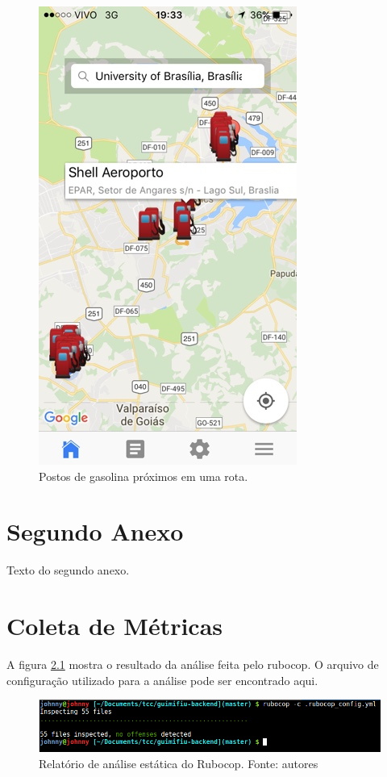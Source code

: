 \begin{anexosenv}
\begin{figure}[H]
    \centering
    \includegraphics[scale=0.5]{figuras/app_5.jpg}
    \caption[Postos de gasolina próximos em uma rota]{Postos de gasolina próximos em uma rota.}
    \label{img:postos_de_gasolina_proximos_em_uma_rota}
\end{figure}

\chapter{Segundo Anexo}

Texto do segundo anexo.
\chapter{Coleta de Métricas}
\label{chap:metricas}

A figura \ref{img:rubocop} mostra o resultado da análise feita pelo rubocop. O arquivo de configuração utilizado para a análise pode ser encontrado aqui.

\begin{figure}[H]
    \centering
    \includegraphics[scale=0.5]{figuras/rubocop.png}
    \caption[Relatório de análise estática do Rubocop]{Relatório de análise estática do Rubocop. Fonte: autores}
    \label{img:rubocop}
\end{figure}


\end{anexosenv}
